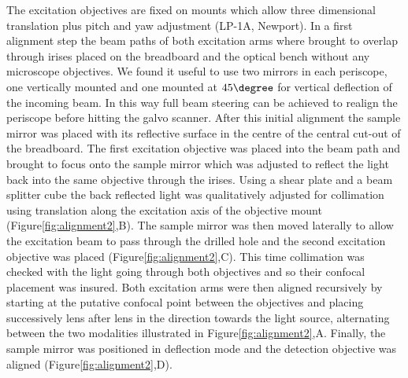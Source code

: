 \documentclass[12pt]{spieman}  %
\begin{document}
The excitation objectives are fixed on mounts which allow three dimensional translation plus pitch and yaw adjustment (LP-1A, Newport). In a first alignment step the beam paths of both excitation arms where brought to overlap through irises placed on the breadboard and the optical bench without any microscope objectives. We found it useful to use two mirrors in each periscope, one vertically mounted and one mounted at $45\degree$ for vertical deflection of the incoming beam. In this way full beam steering can be achieved to realign the periscope before hitting the galvo scanner. After this initial alignment the sample mirror was placed with its reflective surface in the centre of the central cut-out of the breadboard. The first excitation objective was placed into the beam path and brought to focus onto the sample mirror which was adjusted to reflect the light back into the same objective through the irises. Using a shear plate and a beam splitter cube the back reflected light was qualitatively adjusted for collimation using translation along the excitation axis of the objective mount (Figure\ref{fig:alignment2},B). The sample mirror was then moved laterally to allow the excitation beam to pass through the drilled hole and the second excitation objective was placed (Figure\ref{fig:alignment2},C). This time collimation was checked with the light going through both objectives and so their confocal placement was insured. Both excitation arms were then aligned recursively by starting at the putative confocal point between the objectives and placing successively lens after lens in the direction towards the light source, alternating between the two modalities illustrated in Figure\ref{fig:alignment2},A. Finally, the sample mirror was positioned in deflection mode and the detection objective was aligned (Figure\ref{fig:alignment2},D). 
\end{document}
